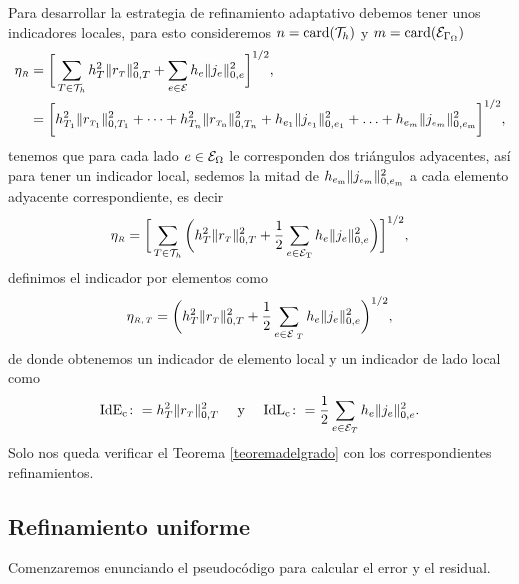 Para desarrollar la estrategia de refinamiento adaptativo debemos tener unos indicadores locales, para esto consideremos $n=\mathop{\rm card}({\mathcal{T}}_{h})$ y $m=\mathop{\rm card}({\mathcal{E}}_{ \Gamma_{\Omega}})$  
\begin{equation}
\begin{split}
\eta_{\text{\tiny $R$}} &=\bigg[ \sum_{T\in{\ensuremath{\mathcal{T}}}_{h}} h^{2}_{T}\| r_{\text{\tiny $T$}} \|^{2}_{0,T}  + \sum_{e\in {\ensuremath{\mathcal{E}}}} h_{e}\|j_{e}\|^{2}_{0,e}  \bigg]^{1/2},\\
&=\bigg[ h^{2}_{T_{1}}\| r_{\text{\tiny  $T_\text{\tiny 1}$}} \|^{2}_{0,T_{1}}+\cdots+h^{2}_{T_{n}}\| r_{\text{\tiny $T_\text{\tiny n}$}} \|^{2}_{0,T_{n}}+ h_{e_{1}}\|j_{\text{\tiny  $e_{1}$}}\|^{2}_{0,e_{\text{\tiny 1}}}+\ldots+h_{e_{m}}\|j_{\text{\tiny  $e_{m}$}}\|^{2}_{0,e_{\text{\tiny m}}} \bigg]^{1/2},
\end{split}
\end{equation}
tenemos que para cada lado $e\in{\ensuremath{\mathcal{E}}}_{\Omega}$ le corresponden dos tri\'angulos adyacentes, as\'i para tener un indicador local, sedemos la mitad de $h_{e_{\text{\tiny m}}}\|j_{\text{\tiny  $e_{m}$}}\|^{2}_{0,e_{\text{\tiny m}}}$ a cada elemento adyacente correspondiente, es decir
\begin{equation}
\begin{split}
\eta_{\text{\tiny $R$}} = \bigg[ \sum_{T\in{\ensuremath{\mathcal{T}}}_{h}} \bigg(h^{2}_{T}\| r_{\text{\tiny $T$}} \|^{2}_{0,T}  + \frac{1}{2}\sum_{e\in {\ensuremath{\mathcal{E}}}_{\text{\tiny T}}} h_{e}\|j_{e}\|^{2}_{0,e} \bigg)  \bigg]^{1/2},\\
\end{split}
\end{equation}
definimos el indicador por elementos como 
\begin{equation}
\eta_{\text{\tiny $R,T$}}=\bigg(h^{2}_{T}\| r_{\text{\tiny $T$}} \|^{2}_{0,T}  + \frac{1}{2}\sum_{e\in {\ensuremath{\mathcal{E}}}_{\text{ \tiny $T$}}} h_{e}\|j_{e}\|^{2}_{0,e} \bigg)^{1/2},
\end{equation}
de donde obtenemos un indicador de elemento local y un indicador de lado local como 
\begin{equation*}
\begin{split}
{\rm IdE_{c}}\colon = h^{2}_{T}\| r_{\text{\tiny $T$}} \|^{2}_{0,T} \quad\text{ y }\quad {\rm IdL_{c}}\colon = \dfrac{1}{2}\sum_{e\in{\ensuremath{\mathcal{E}}}_{T}} h_{e}\|j_{e}\|^{2}_{0,e}.
\end{split}
\end{equation*}
Solo nos queda verificar el Teorema \eqref{teoremadelgrado} con los correspondientes refinamientos. 

\subsection{Refinamiento uniforme}
Comenzaremos enunciando el pseudoc\'odigo para calcular el error y el residual.

